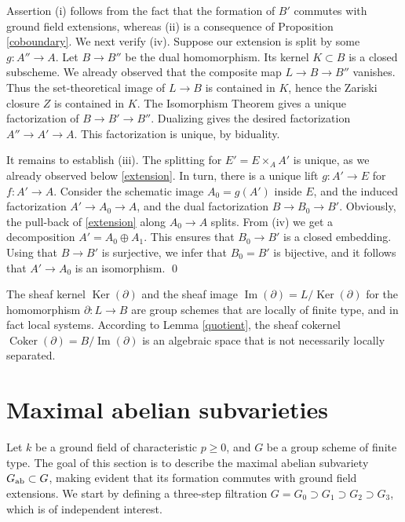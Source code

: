 \documentclass[oneside, 12pt]{amsart}
\newcommand\mylabel[1]{\label{#1}\marginpar{\raggedright\vspace{-1ex}\medskip\medskip\footnotesize \tt #1}}
\renewcommand\mylabel[1]{\label{#1}}
\theoremstyle{definition}
\theoremstyle{remark}
\newcommand{\Cokernel}{\operatorname{Coker}}
\newcommand{\Image}{\operatorname{Im}}
\newcommand{\Kernel}{\operatorname{Ker}}
\newcommand{\ra}{\rightarrow}
\begin{document}
\proof
Assertion (i) follows from the fact that the formation of $B'$ commutes with ground field extensions, 
whereas (ii) is a consequence of Proposition \ref{coboundary}.
We next verify (iv). Suppose our extension is split by some $g:A''\ra A$. Let $B\ra B''$ be the dual homomorphism.
Its kernel $K\subset B$ is a closed subscheme. We already observed that the composite map $L\ra B\ra B''$ vanishes.
Thus the set-theoretical image of $L\ra B$ is contained in $K$, hence the Zariski closure $Z$ is contained
in $K$. The Isomorphism Theorem gives a unique factorization of $B\ra B'\ra B''$.
Dualizing gives the desired factorization $A''\ra A'\ra A$. This factorization is unique, by biduality.

It remains to establish (iii). The splitting for $E'=E\times_AA'$ is unique, as we already observed below \eqref{extension}.
In turn, there is a unique lift $g:A'\ra E$ for $f:A'\ra A$. Consider the schematic image $A_0=g(A')$ inside $E$,
and the induced factorization $A'\ra A_0\ra A$, and the   dual factorization $B\ra B_0\ra B'$.
Obviously, the  pull-back of \eqref{extension} along $A_0\ra A$ splits. From (iv) we get a decomposition
$A'=A_0\oplus A_1$. This ensures that  $B_0\ra B'$ is a closed embedding. Using that $B\ra B'$ is surjective,
we infer that $B_0=B'$ is bijective, and it follows that $A'\ra A_0$ is an isomorphism.
\qed

\medskip
The sheaf kernel $\Kernel(\partial)$ and the sheaf image $\Image(\partial)=L/\Kernel(\partial)$ for the homomorphism   
$\partial:L\ra B$ are group schemes that are locally of finite type, and in fact local systems. 
According to Lemma \ref{quotient}, the sheaf cokernel $\Cokernel(\partial)=B/\Image(\partial)$
is an algebraic space that is not necessarily locally separated.


\section{Maximal abelian subvarieties}
\mylabel{Maximal abelian}

Let $k$ be a ground field of characteristic $p\geq 0$, and $G$ be a group scheme of finite type.
The goal of this section is to describe the  maximal abelian subvariety $G_{\text{\rm ab}}\subset G$, making
evident that its formation commutes with ground field extensions. 
We start by defining a   three-step filtration $G=G_0\supset G_1\supset G_2\supset G_3$, which is of independent interest.
 
\end{document}
